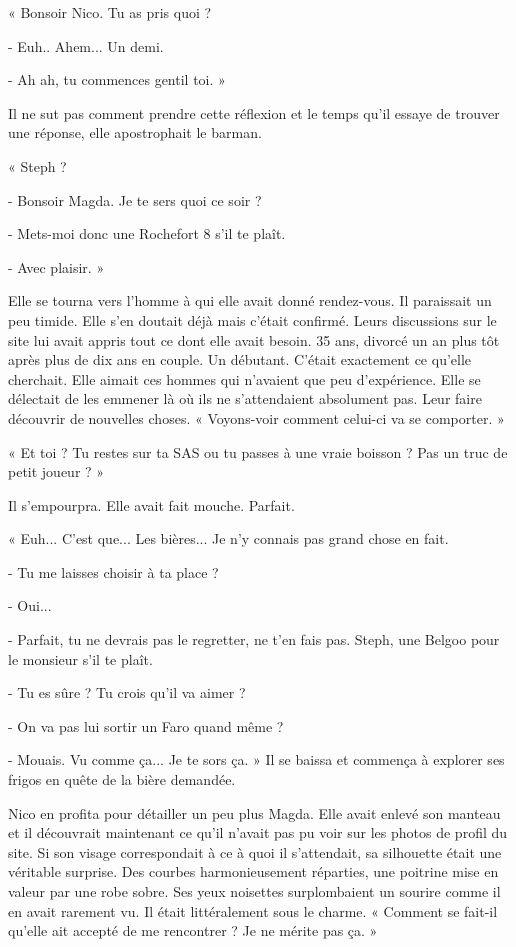 « Bonsoir Nico. Tu as pris quoi ?

- Euh.. Ahem... Un demi.

- Ah ah, tu commences gentil toi. »

Il ne sut pas comment prendre cette réflexion et le temps qu'il essaye de trouver une réponse, elle apostrophait le
barman.

« Steph ?

- Bonsoir Magda. Je te sers quoi ce soir ?

- Mets-moi donc une Rochefort 8 s'il te plaît.

- Avec plaisir. »

Elle se tourna vers l'homme à qui elle avait donné rendez-vous. Il paraissait un peu timide. Elle s'en doutait déjà mais
c'était confirmé. Leurs discussions sur le site lui avait appris tout ce dont elle avait besoin. 35 ans, divorcé un an
plus tôt après plus de dix ans en couple. Un débutant. C'était exactement ce qu'elle cherchait. Elle aimait ces hommes qui
n'avaient que peu d'expérience. Elle se délectait de les emmener là où ils ne s'attendaient absolument pas. Leur faire
découvrir de nouvelles choses. « Voyons-voir comment celui-ci va se comporter. »

« Et toi ? Tu restes sur ta SAS ou tu passes à une vraie boisson ? Pas un truc de petit joueur ? »

Il s'empourpra. Elle avait fait mouche. Parfait.

« Euh... C'est que... Les bières... Je n'y connais pas grand chose en fait.

- Tu me laisses choisir à ta place ?

- Oui...

- Parfait, tu ne devrais pas le regretter, ne t'en fais pas. Steph, une Belgoo pour le monsieur s'il te plaît.

- Tu es sûre ? Tu crois qu'il va aimer ?

- On va pas lui sortir un Faro quand même ?

- Mouais. Vu comme ça... Je te sors ça. » Il se baissa et commença à explorer ses frigos en quête de la bière demandée.

Nico en profita pour détailler un peu plus Magda. Elle avait enlevé son manteau et il découvrait maintenant ce qu'il
n'avait pas pu voir sur les photos de profil du site. Si son visage correspondait à ce à quoi il s'attendait, sa
silhouette était une véritable surprise. Des courbes harmonieusement réparties, une poitrine mise en valeur
par une robe sobre. Ses yeux noisettes surplombaient un sourire comme il en avait rarement vu.
Il était littéralement sous le charme. « Comment se fait-il qu'elle ait accepté de me rencontrer ? Je ne mérite pas ça. »

